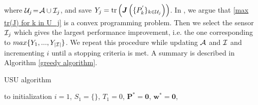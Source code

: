 \documentclass[conference]{IEEEtran}
\def\dashfill{\cleaders\hbox{-~-}\hfill}
\def\dashfill{\cleaders\hbox{-~-}\hfill}
\begin{document}
where ${\cal U}_j\!=\!{\cal A}\cup {\cal I}_j$, and save $Y_{j}=\text{tr}\left(\boldsymbol{J}\left(\{P^{'}_k\}_{k\in {\cal U}_j}\right)\right)$. In \cite{Shirazi_Vosoughi_journal_2017}, we argue that \eqref{max tr(J) for k in U_j} is a convex programming problem. Then we select the sensor ${\cal I}_j$ which gives the largest performance improvement, i.e. the one corresponding to $max\{Y_{1}, ..., Y_{|{\cal I}|}\}$. We repeat this procedure while updating ${\cal A}$ and ${\cal I}$ and incrementing $i$ until a stopping criteria is met. 
A summary is described in Algorithm \ref{greedy algorithm}.\\
%
\begin{algorithm}[t]
\caption{USU algorithm}
\label{USU algorithm}
 \vspace{-0.1cm}
 \hbox to \hsize{\dashfill\hfil}
\vspace{-0.1cm}
initialization\;  
$i=1$, $S_1=\{\}$, $T_1=0$, $\boldsymbol{P}^{*}=\boldsymbol{0}$, $\boldsymbol{w}^{*}=\boldsymbol{0}$,\\

\vspace{-0.1cm}
\end{algorithm}
\end{document}
